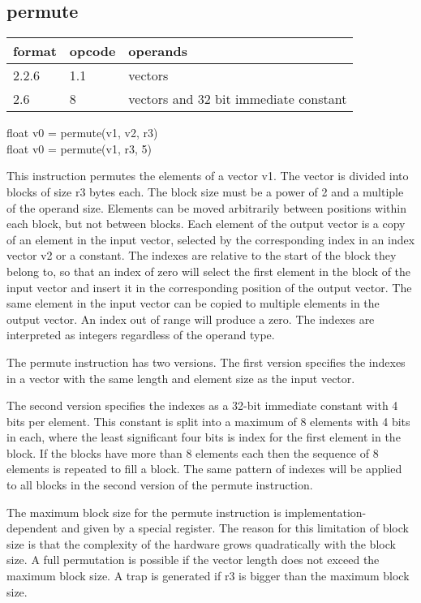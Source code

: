\documentclass[forwardcom.tex]{subfiles}
\begin{document}
\subsection{permute}
\label{table:permuteInstruction}
\begin{tabular}{|p{12mm}|p{15mm}|p{100mm}|}
\hline
\bfseries format & \bfseries opcode & \bfseries operands \\ \hline
2.2.6 & 1.1 & vectors \\ \hline
2.6   & 8   & vectors and 32 bit immediate constant \\ \hline
\end{tabular}
\vv

float v0 = permute(v1, v2, r3) \\
float v0 = permute(v1, r3, 5) \\
\vv

This instruction permutes the elements of a vector v1. The vector is divided into blocks of size r3 bytes each. The block size must be a power of 2 and a multiple of the operand size. Elements can be moved arbitrarily between positions within each block, but not between blocks. Each element of the output vector is a copy of an element in the input vector, selected by the corresponding index in an index vector v2 or a constant. The indexes are relative to the start of the block they belong to, so that an index of zero will select the first element in the block of the input vector and insert it in the corresponding position of the output vector. The same element in the input vector can be copied to multiple elements in the output vector. An index out of range will produce a zero. The indexes are interpreted as integers regardless of the operand type.
\vv

The permute instruction has two versions. The first version specifies the indexes in a vector with the same length and element size as the input vector.
\vv

The second version specifies the indexes as a 32-bit immediate constant with 4 bits per element. This constant is split into a maximum of 8 elements with 4 bits in each, where the least significant four bits is index for the first element in the block.
If the blocks have more than 8 elements each then the sequence of 8 elements is repeated to fill a block. The same pattern of indexes will be applied to all blocks in the second version of the permute instruction.
\vv

The maximum block size for the permute instruction is implementation-dependent and given by a special register. The reason for this limitation of block size is that the complexity of the hardware grows quadratically with the block size. A full permutation is possible if the vector length does not exceed the maximum block size. A trap is generated if r3 is bigger than the maximum block size.
\vv
\end{document}
